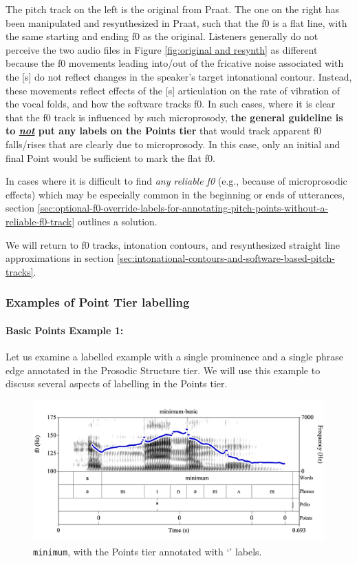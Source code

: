 \documentclass[11pt, twoside]{memoir}
\def\textlabel#1{{\relsize{-.5}\fontspec[Mapping=tex-text]{Roboto Mono}{#1}}}
\begin{document}
The pitch track on the left is the original from Praat. The one on the right has been manipulated and resynthesized in Praat, such that the f0 is a flat line, with the same starting and ending f0 as the original. Listeners generally do not perceive the two audio files in Figure \ref{fig:original and resynth} as different because the f0 movements leading into\slash out of the fricative noise associated with the [s] do not reflect changes in the speaker’s target intonational contour.  Instead, these movements reflect effects of the [s] articulation on the rate of vibration of the vocal folds, and how the software tracks f0. In such cases, where it is clear that the f0 track is influenced by such microprosody, \textbf{the general guideline is to \textit{\uline{not}} put any labels on the Points tier} that would track apparent f0 falls\slash rises that are clearly due to microprosody. In this case, only an initial and final Point would be sufficient to mark the flat f0.

In cases where it is difficult to find \textit{any reliable f0} (e.g., because of microprosodic effects) which may be especially common in the beginning or ends of utterances, section \ref{sec:optional-f0-override-labels-for-annotating-pitch-points-without-a-reliable-f0-track} outlines a solution.

We will return to f0 tracks, intonation contours, and resynthesized straight line approximations in section \ref{sec:intonational-contours-and-software-based-pitch-tracks}.

\subsubsection{Examples of Point Tier labelling}\label{sec:examples-of-point-tier-labelling}

\paragraph{Basic Points Example 1:\label{basic-points-example-1}}

Let us examine a labelled example with a single prominence and a single phrase edge annotated in the Prosodic Structure tier. We will use this example to discuss several aspects of labelling in the Points tier.

\begin{figure}[H]
\centering
%
\includegraphics[width=.875\linewidth]{Points-minimum-basic.png}
%
\caption{\texttt{minimum}, with the Points tier annotated with ‘\textlabel{0}’ labels.%
\label{fig:minimum Points basic}%
%
}
\end{figure}
\end{document}
